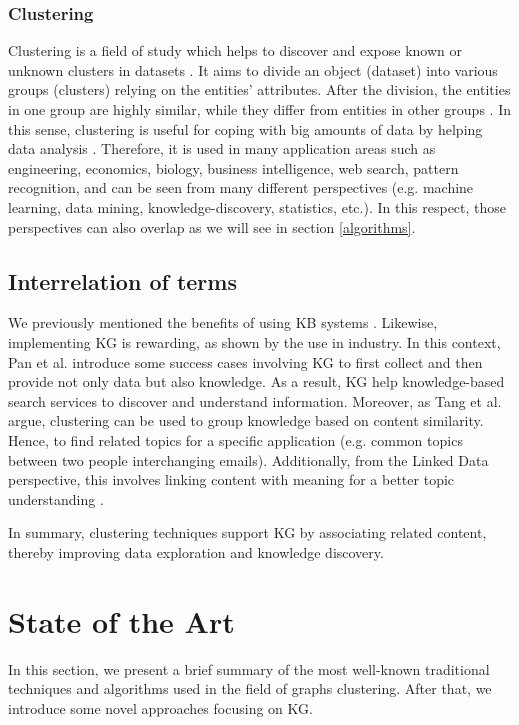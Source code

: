 \documentclass[runningheads]{llncs}
\begin{document}
\subsubsection{Clustering} \label{clustering}
Clustering is a field of study which helps to discover and expose known or unknown clusters in datasets \cite{Han} \cite{Mirkin}. It aims to divide an object (dataset) into various groups (clusters) relying on the entities' attributes. After the division, the entities in one group are highly similar, while they differ from entities in other groups \cite{Han}. In this sense, clustering is useful for coping with big amounts of data by helping data analysis \cite{Pedrycz} \cite{Mirkin}. Therefore, it is used in many application areas such as engineering, economics, biology, business intelligence, web search, pattern recognition, \cite{Pedrycz} \cite{Han} and can be seen from many different perspectives (e.g. machine learning, data mining, knowledge-discovery, statistics, etc.). In this respect, those perspectives can also overlap as we will see in section \ref{algorithms}.


\subsection{Interrelation of terms} \label{interrelation}
We previously mentioned the benefits of using KB systems \cite{Engelmore}. Likewise, implementing KG is 
rewarding, as shown by the use in industry. In this context, Pan et al. \cite{Pan} introduce some success cases involving KG to first collect and then provide not only data but also knowledge. As a result, KG help knowledge-based search services to discover and understand information. Moreover, as Tang et al. \cite{Tang} argue, clustering can be used to group knowledge based on content similarity. Hence, to find related topics for a specific application (e.g. common topics between two people interchanging emails). Additionally, from the Linked Data perspective, this involves linking content with meaning for a better topic understanding \cite{Pan}.

In summary, clustering techniques support KG by associating related content, thereby improving data exploration and knowledge discovery.


\section{State of the Art}\label{state-art}
In this section, we present a brief summary of the most well-known traditional techniques and algorithms used in the field of graphs clustering. After that, we introduce some novel approaches focusing on KG. 
\end{document}
